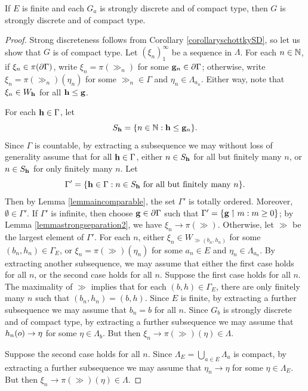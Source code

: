 \begin{corollary}
\label{corollaryschottkycompacttype}
If $E$ is finite and each $G_a$ is strongly discrete and of compact type, then $G$ is strongly discrete and of compact type.
\end{corollary}
\begin{proof}
Strong discreteness follows from Corollary \ref{corollaryschottkySD}, so let us show that $G$ is of compact type. Let $(\xi_n)_1^\infty$ be a sequence in $\Lambda$. For each $n\in\N$, if $\xi_n\in \pi(\partial\Gamma)$, write $\xi_n = \pi(\gg_n)$ for some $\mathbf g_n\in\partial\Gamma$; otherwise, write $\xi_n = \pi(\gg_n)(\eta_n)$ for some $\gg_n\in\Gamma$ and $\eta_n\in\Lambda_{a_n}$. Either way, note that $\xi_n\in W_\mathbf h$ for all $\mathbf h\leq\mathbf g$.

For each $\mathbf h\in\Gamma$, let
\[
S_\hh = \{n\in\N : \hh\leq\gg_n\}.
\]
Since $\Gamma$ is countable, by extracting a subsequence we may without loss of generality assume that for all $\mathbf h\in\Gamma$, either $n\in S_\mathbf h$ for all but finitely many $n$, or $n\in S_\mathbf h$ for only finitely many $n$. Let
\[
\Gamma' = \{\mathbf h\in\Gamma : \textup{$n\in S_\mathbf h$ for all but finitely many $n$}\}.
\]
Then by Lemma \ref{lemmaincomparable}, the set $\Gamma'$ is totally ordered. Moreover, $\emptyset\in \Gamma'$. If $\Gamma'$ is infinite, then choose $\mathbf g\in\partial\Gamma$ such that $\Gamma' = \{\mathbf g\upharpoonleft m : m\geq 0\}$; by Lemma \ref{lemmastrongseparation2}, we have $\xi_n\to\pi(\gg)$. Otherwise, let $\gg$ be the largest element of $\Gamma'$. For each $n$, either $\xi_n\in W_{\gg(b_n,h_n)}$ for some $(b_n,h_n)\in\Gamma_E$, or $\xi_n = \pi(\gg)(\eta_n)$ for some $a_n\in E$ and $\eta_n\in\Lambda_{a_n}$. By extracting another subsequence, we may assume that either the first case holds for all $n$, or the second case holds for all $n$. Suppose the first case holds for all $n$. The maximality of $\gg$ implies that for each $(b,h)\in\Gamma_E$, there are only finitely many $n$ such that $(b_n,h_n) = (b,h)$. Since $E$ is finite, by extracting a further subsequence we may assume that $b_n = b$ for all $n$. Since $G_b$ is strongly discrete and of compact type, by extracting a further subsequence we may assume that $h_n(o)\to \eta$ for some $\eta\in \Lambda_b$. But then $\xi_n \to \pi(\gg)(\eta)\in\Lambda$.

Suppose the second case holds for all $n$. Since $\Lambda_E = \bigcup_{a\in E} \Lambda_a$ is compact, by extracting a further subsequence we may assume that $\eta_n\to \eta$ for some $\eta\in\Lambda_E$. But then $\xi_n \to \pi(\gg)(\eta)\in\Lambda$.
\end{proof}

